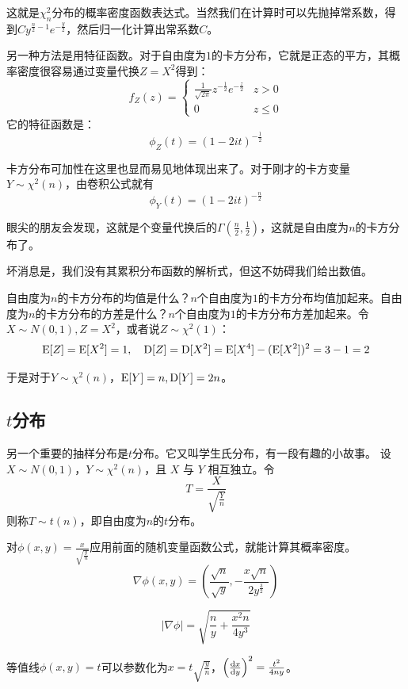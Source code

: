 这就是$\chi^2_n$分布的概率密度函数表达式。当然我们在计算时可以先抛掉常系数，得到$Cy^{\frac n2 -1}e^{-\frac y2}$，然后归一化计算出常系数$C$。

另一种方法是用特征函数。对于自由度为$1$的卡方分布，它就是正态的平方，其概率密度很容易通过变量代换$Z=X^2$得到：
\[
f_Z(z) = \begin{cases}
    \frac{1}{\sqrt{2\pi}}z^{-\frac12}e^{-\frac z2} & z >0\\
    0 & z\leq 0
\end{cases}
\]
它的特征函数是：
\[
\phi_Z(t) = (1-2it)^{-\frac{1}{2}}
\]

卡方分布可加性在这里也显而易见地体现出来了。对于刚才的卡方变量$Y\sim \chi^2(n)$，由卷积公式就有
\[
\phi_Y(t) = (1-2it)^{-\frac{n}{2}}
\]

眼尖的朋友会发现，这就是个变量代换后的$\Gamma(\frac{n}{2},\frac12)$，这就是自由度为$n$的卡方分布了。

坏消息是，我们没有其累积分布函数的解析式，但这不妨碍我们给出数值。

自由度为$n$的卡方分布的均值是什么？$n$个自由度为$1$的卡方分布均值加起来。自由度为$n$的卡方分布的方差是什么？$n$个自由度为$1$的卡方分布方差加起来。令$X\sim N(0,1),Z=X^2$，或者说$Z\sim \chi^2(1)$：
\[
\operatorname{E}[Z]=\operatorname{E}[X^2]=1,\quad \operatorname{D}[Z]=\operatorname{D}[X^2]=\operatorname{E}[X^4]-(\operatorname{E}[X^2])^2=3-1=2
\]

于是对于$Y\sim \chi^2(n)$，$\operatorname{E}[Y]=n,\operatorname{D}[Y]=2n$。

\subsection{$t$分布}
另一个重要的抽样分布是$t$分布。它又叫学生氏分布，有一段有趣的小故事。
设 $X \sim N(0,1)$，$Y \sim \chi^2(n)$，且 $X$ 与 $Y$ 相互独立。令
\[
T=\frac{X}{\sqrt{\frac{Y}{n}}}
\]
则称$T\sim t(n)$，即自由度为$n$的$t$分布。

对$\phi(x,y) =\frac{x}{\sqrt{\frac{y}{n}}}$应用前面的随机变量函数公式，就能计算其概率密度。
\[
\nabla \phi(x,y) = \left(\frac{\sqrt{n}}{\sqrt{y}}, -\frac{x\sqrt{n}}{2y^{\frac32}}\right)
\]

\[
|\nabla\phi| = \sqrt{\frac{n}{y}+\frac{x^2n}{4y^3}} 
\]

等值线$\phi(x,y)=t$可以参数化为$x= t\sqrt{\frac{y}{n}}$，$\left(\frac{\mathop{}\!\mathrm{d} x}{\mathop{}\!\mathrm{d} y}\right)^2=\frac{t^2}{4ny}$。

